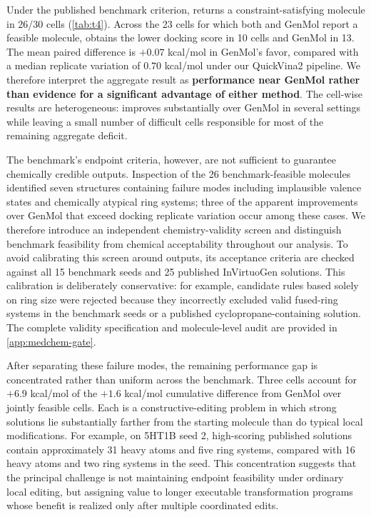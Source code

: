 Under the published benchmark criterion, \method{} returns a constraint-satisfying molecule in 26/30 cells (\cref{tab:t4}). Across the 23 cells for which both \method{} and GenMol report a feasible molecule, \method{} obtains the lower docking score in 10 cells and GenMol in 13. The mean paired difference is $+0.07$ kcal/mol in GenMol's favor, compared with a median replicate variation of $0.70$ kcal/mol under our QuickVina2 pipeline. We therefore interpret the aggregate result as \textbf{performance near GenMol rather than evidence for a significant advantage of either method}. The cell-wise results are heterogeneous: \method{} improves substantially over GenMol in several settings while leaving a small number of difficult cells responsible for most of the remaining aggregate deficit.

The benchmark's endpoint criteria, however, are not sufficient to guarantee chemically credible outputs. Inspection of the 26 benchmark-feasible \method{} molecules identified seven structures containing failure modes including implausible valence states and chemically atypical ring systems; three of the apparent \method{} improvements over GenMol that exceed docking replicate variation occur among these cases. We therefore introduce an independent chemistry-validity screen and distinguish benchmark feasibility from chemical acceptability throughout our analysis. To avoid calibrating this screen around \method{} outputs, its acceptance criteria are checked against all 15 benchmark seeds and 25 published InVirtuoGen solutions. This calibration is deliberately conservative: for example, candidate rules based solely on ring size were rejected because they incorrectly excluded valid fused-ring systems in the benchmark seeds or a published cyclopropane-containing solution. The complete validity specification and molecule-level audit are provided in \cref{app:medchem-gate}.

After separating these failure modes, the remaining performance gap is concentrated rather than uniform across the benchmark. Three cells account for $+6.9$ kcal/mol of the $+1.6$ kcal/mol cumulative difference from GenMol over jointly feasible cells. Each is a constructive-editing problem in which strong solutions lie substantially farther from the starting molecule than do typical local modifications. For example, on 5HT1B seed 2, high-scoring published solutions contain approximately 31 heavy atoms and five ring systems, compared with 16 heavy atoms and two ring systems in the seed. This concentration suggests that the principal challenge is not maintaining endpoint feasibility under ordinary local editing, but assigning value to longer executable transformation programs whose benefit is realized only after multiple coordinated edits.

